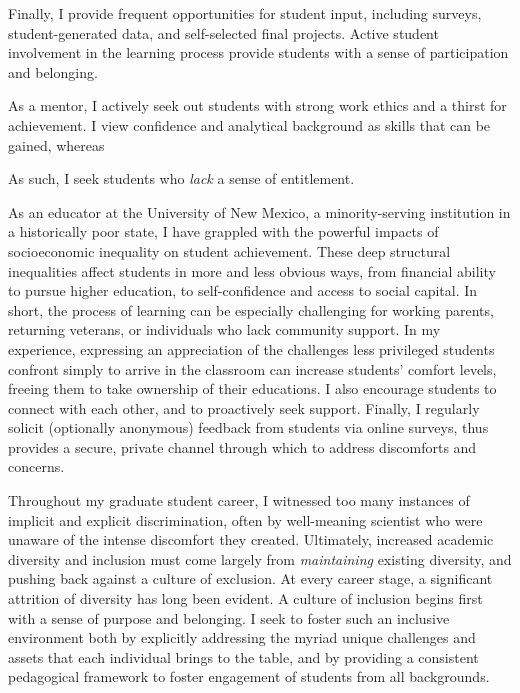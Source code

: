\documentclass[12pt]{article}
\begin{document}
Finally, I provide frequent opportunities
for student input, including surveys, student-generated data, 
and self-selected final projects.  Active student involvement 
in the learning process provide students with a sense 
of participation and belonging. 

As a mentor, I actively seek out students with strong work 
ethics and a thirst for achievement. I view confidence and 
analytical background as skills that can be gained, whereas

As such, I seek students
who {\em lack} a sense of entitlement. 

As an educator at the University of New Mexico, a 
minority-serving institution in
a historically poor state, I have grappled with the powerful
impacts of socioeconomic inequality on student achievement. 
These deep structural inequalities affect students in more 
and less obvious ways, from financial ability to pursue higher 
education, to self-confidence and access to social capital.
In short, the process of learning can be especially challenging
for working parents, returning veterans, or individuals who
lack community support. In my experience, expressing an 
appreciation of the challenges less privileged students confront
simply to arrive in the classroom can increase students'
comfort levels, freeing them to take ownership of their educations.
I also encourage students to connect with each other,
and to proactively seek support. Finally, I 
regularly solicit (optionally anonymous) feedback 
from students via online surveys, thus provides a 
secure, private channel through which to address discomforts 
and concerns.

Throughout my graduate student career, 
I witnessed too many instances of implicit and explicit 
discrimination, often by well-meaning scientist who were 
unaware of the intense discomfort they created. 
Ultimately, increased academic diversity and inclusion must 
come largely from {\em maintaining} existing diversity, and 
pushing back against a culture of exclusion. At every career 
stage, a significant attrition of diversity has long been 
evident. A culture of inclusion begins first with a sense of 
purpose and belonging. I seek to foster such an inclusive 
environment both by explicitly addressing the myriad unique 
challenges and 
assets that each individual brings to the table, and by
providing a consistent pedagogical framework to foster 
engagement of students from all backgrounds. 
\end{document}

